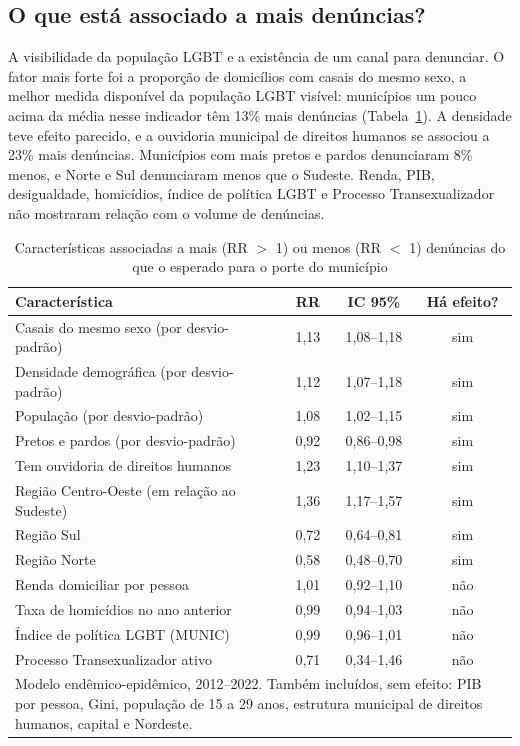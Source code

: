 \documentclass[12pt]{article}
\begin{document}
\subsection{O que está associado a mais denúncias?}

A visibilidade da população LGBT e a existência de um canal para denunciar. O fator mais forte foi a proporção de domicílios com casais do mesmo sexo, a melhor medida disponível da população LGBT visível: municípios um pouco acima da média nesse indicador têm 13\% mais denúncias (Tabela~\ref{tab:coef}). A densidade teve efeito parecido, e a ouvidoria municipal de direitos humanos se associou a 23\% mais denúncias. Municípios com mais pretos e pardos denunciaram 8\% menos, e Norte e Sul denunciaram menos que o Sudeste. Renda, PIB, desigualdade, homicídios, índice de política LGBT e Processo Transexualizador não mostraram relação com o volume de denúncias.

\begin{table}[!htb]
\centering
\caption{Características associadas a mais (RR $>$ 1) ou menos (RR $<$ 1) denúncias do que o esperado para o porte do município}
\label{tab:coef}
{\renewcommand{\arraystretch}{1.1}\small
\begin{tabular}{p{6.8cm} c c c}
\toprule
\textbf{Característica} & \textbf{RR} & \textbf{IC 95\%} & \textbf{Há efeito?} \\
\midrule
Casais do mesmo sexo (por desvio-padrão) & 1,13 & 1,08--1,18 & sim \\
Densidade demográfica (por desvio-padrão) & 1,12 & 1,07--1,18 & sim \\
População (por desvio-padrão) & 1,08 & 1,02--1,15 & sim \\
Pretos e pardos (por desvio-padrão) & 0,92 & 0,86--0,98 & sim \\
Tem ouvidoria de direitos humanos & 1,23 & 1,10--1,37 & sim \\
Região Centro-Oeste (em relação ao Sudeste) & 1,36 & 1,17--1,57 & sim \\
Região Sul & 0,72 & 0,64--0,81 & sim \\
Região Norte & 0,58 & 0,48--0,70 & sim \\
Renda domiciliar por pessoa & 1,01 & 0,92--1,10 & não \\
Taxa de homicídios no ano anterior & 0,99 & 0,94--1,03 & não \\
Índice de política LGBT (MUNIC) & 0,99 & 0,96--1,01 & não \\
Processo Transexualizador ativo & 0,71 & 0,34--1,46 & não \\
\bottomrule
\multicolumn{4}{p{12cm}}{\footnotesize Modelo endêmico-epidêmico, 2012--2022. Também incluídos, sem efeito: PIB por pessoa, Gini, população de 15 a 29 anos, estrutura municipal de direitos humanos, capital e Nordeste.}
\end{tabular}}
\end{table}
\end{document}
